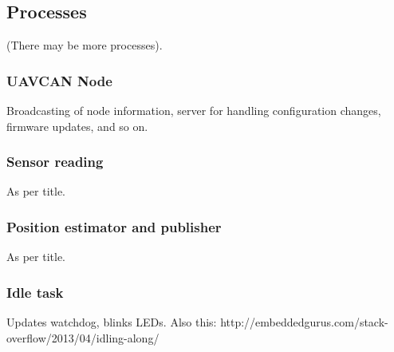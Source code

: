 \subsection{Processes}
(There may be more processes).


\subsubsection{UAVCAN Node}
Broadcasting of node information, server for handling configuration changes, firmware updates, and so on.

\subsubsection{Sensor reading}
As per title.

\subsubsection{Position estimator and publisher}
As per title.

\subsubsection{Idle task}
Updates watchdog, blinks LEDs.
Also this: http://embeddedgurus.com/stack-overflow/2013/04/idling-along/
